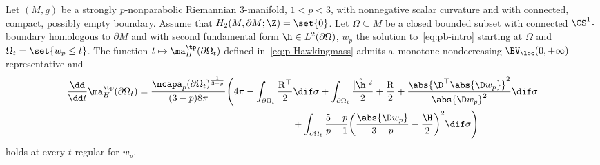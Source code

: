 \begin{Theorem}\label{thm:AMMO_monotonicity}
 Let $(M,g)$ be a strongly $p$-nonparabolic Riemannian $3$-manifold, ${1<p<3}$, with nonnegative scalar curvature and with connected, compact, possibly empty boundary. Assume that $H_2(M, \partial M;\Z) = \set{0}$. Let $\Omega\subseteq M$ be a closed bounded subset with connected $\CS^1$-boundary homologous to $\partial M$ and with second fundamental form $\h \in L^2(\partial \Omega)$, $w_p$ the solution to~\eqref{eq:pb-intro} starting at $\Omega$ and $\Omega_t= \set{w_p \leq t}$. The function $t\mapsto \ma_H^{\tp}(\partial \Omega_t)$ defined in~\eqref{eq:p-Hawkingmass} admits a~monotone nondecreasing $\BV_{\loc}(0,+\infty)$ representative and
 \begin{gather}
 \frac{\dd}{\dd t} \ma^{\tp}_H (\partial \Omega_t)=\frac{\ncapa_p(\partial \Omega_t)^{\frac{1}{3-p}}}{(3-p) 8 \pi} \Bigg( 4\pi -\int_{\partial \Omega_t}\frac{\mathrm{R}^\top}{2} \dif \sigma +\int_{\partial \Omega_t} \frac{\vert \mathring{\h} \vert^2}{2} + \frac{ \mathrm{R}}{2} + \frac{ \abs{ \D^\top \abs{ \D w_p} }^2}{\abs{ \D w_p}^2}\dif \sigma \nonumber \\
 \hphantom{\frac{\dd}{\dd t} \ma^{\tp}_H (\partial \Omega_t)=\frac{\ncapa_p(\partial \Omega_t)^{\frac{1}{3-p}}}{(3-p) 8 \pi} \bigg(}{}
 + \int_{\partial \Omega_t}\frac{5-p}{p-1}\bigg(\frac{ \abs{\D w_p}}{3-p} - \frac{ \H}{2}\bigg)^2\dif \sigma\Bigg)\label{eq:AMMO_monotonicity}
 \end{gather}
 holds at every $t$ regular for $w_p$.
\end{Theorem}
